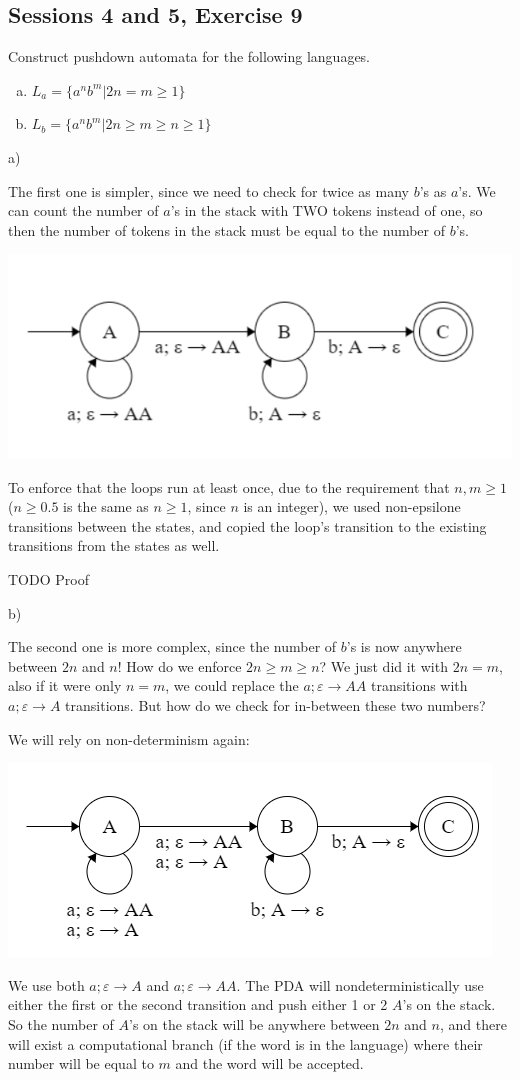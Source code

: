 \subsection{Sessions 4 and 5, Exercise 9}

\label{4f9}


Construct pushdown automata for the following languages.

\begin{enumerate}[a)]
\item $L_a = \{a^nb^m | 2n = m \geq{} 1\}$
\item $L_b = \{a^nb^m | 2n \geq{} m \geq{} n \geq{} 1\}$
\end{enumerate}


a)

The first one is simpler, since we need to check for twice as many $b$'s as $a$'s. We can count the number of $a$'s in the stack with TWO tokens instead of one, so then the number of tokens in the stack must be equal to the number of $b$'s.

\includegraphics[width=0.5\linewidth]{04/4_9_a.png}

To enforce that the loops run at least once, due to the requirement that $n,m\geq{}1$ ($n\geq{}0.5$ is the same as $n\geq{}1$, since $n$ is an integer), we used non-epsilone transitions between the states, and copied the loop's transition to the existing transitions from the states as well.

TODO Proof

b)

The second one is more complex, since the number of $b$'s is now anywhere between $2n$ and $n$! How do we enforce $2n \geq{} m \geq{} n$? We just did it with $2n = m$, also if it were only $n = m$, we could replace the $a; \varepsilon \rightarrow AA$ transitions with  $a; \varepsilon \rightarrow A$ transitions. But how do we check for in-between these two numbers?

We will rely on non-determinism again:

\includegraphics[width=0.5\linewidth]{04/4_9_b.png}

We use both $a; \varepsilon \rightarrow A$ and $a; \varepsilon \rightarrow AA$. The PDA will nondeterministically use either the first or the second transition and push either 1 or 2 $A$'s on the stack. So the number of $A$'s on the stack will be anywhere between $2n$ and $n$, and there will exist a computational branch (if the word is in the language) where their number will be equal to $m$ and the word will be accepted.